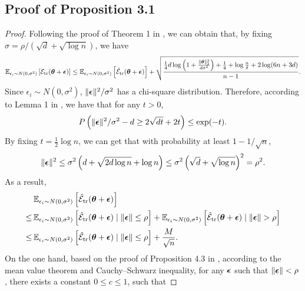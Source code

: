 \subsection{Proof of Proposition 3.1}
\begin{proof}
    Following the proof of Theorem 1 in \cite{foret2021sharpness}, we can obtain that, by fixing $\sigma = \rho / (\sqrt{d} + \sqrt{\log n})$, we have
    \begin{equation} \label{eq:proof-generalization-main-0}
        \mathbb{E}_{\epsilon_i \sim N(0, \sigma^2)}\left[\mathcal{E}_{{\text{tr}}}(\boldsymbol{\theta}+\boldsymbol{\epsilon})\right] \leq \mathbb{E}_{\epsilon_i \sim N(0, \sigma^2)}\left[\hat{\mathcal{E}}_{{\text{tr}}}(\boldsymbol{\theta}+\boldsymbol{\epsilon})\right]+\sqrt{\frac{\frac{1}{4} d \log \left(1+\frac{\|\boldsymbol{\theta}\|_2^2}{d \sigma^2}\right)+\frac{1}{4}+\log \frac{n}{\delta}+2 \log (6 n+3 d)}{n-1}}.
    \end{equation}
    Since $\epsilon_i \sim N(0, \sigma^2)$, $\|\boldsymbol{\epsilon}\|^2/\sigma^2$ has a chi-square distribution. Therefore, according to Lemma 1 in \cite{laurent2000adaptive}, we have that for any $t > 0$,
    \begin{equation}
        P\left(\|\boldsymbol{\epsilon}\|^2/\sigma^2 - d \geq 2 \sqrt{ dt}+2 t\right) \leq \exp (-t).
    \end{equation}
    By fixing $t = \frac{1}{2}\log n$, we can get that with probability at least $1 - 1 / \sqrt{n}$,
    \begin{equation}
      \|\boldsymbol{\epsilon}\|^2 \le \sigma^2\left(d + \sqrt{2d \log n} + \log n\right) \le \sigma^2\left(\sqrt{d} + \sqrt{\log n}\right)^2 = \rho^2.
    \end{equation}
    As a result,
    \begin{equation} \label{eq:proof-generalization-main-1}
        \begin{aligned}
            & \, \mathbb{E}_{\epsilon_i \sim N(0, \sigma^2)}\left[\hat{\mathcal{E}}_{{\text{tr}}}(\boldsymbol{\theta}+\boldsymbol{\epsilon})\right] \\
            \le & \, \mathbb{E}_{\epsilon_i \sim N(0, \sigma^2)}\left[\hat{\mathcal{E}}_{{\text{tr}}}(\boldsymbol{\theta}+\boldsymbol{\epsilon}) \mid \|\boldsymbol{\epsilon}\| \le \rho\right] + \mathbb{E}_{\epsilon_i \sim N(0, \sigma^2)}\left[\hat{\mathcal{E}}_{{\text{tr}}}(\boldsymbol{\theta}+\boldsymbol{\epsilon}) \mid \|\boldsymbol{\epsilon}\| > \rho\right] \\
            \le & \, \mathbb{E}_{\epsilon_i \sim N(0, \sigma^2)}\left[\hat{\mathcal{E}}_{{\text{tr}}}(\boldsymbol{\theta}+\boldsymbol{\epsilon}) \mid \|\boldsymbol{\epsilon}\| \le \rho\right] + \frac{M}{\sqrt{n}}. \\
        \end{aligned}
    \end{equation}
    On the one hand, based on the proof of Proposition 4.3 in \cite{Zhang2023GradientNA}, according to the mean value theorem and Cauchy–Schwarz inequality, for any $\boldsymbol{\epsilon}$ such that $\|\boldsymbol{\epsilon}\| < \rho$, there exists a constant $0 \le c \le 1$, such that

\end{proof}
